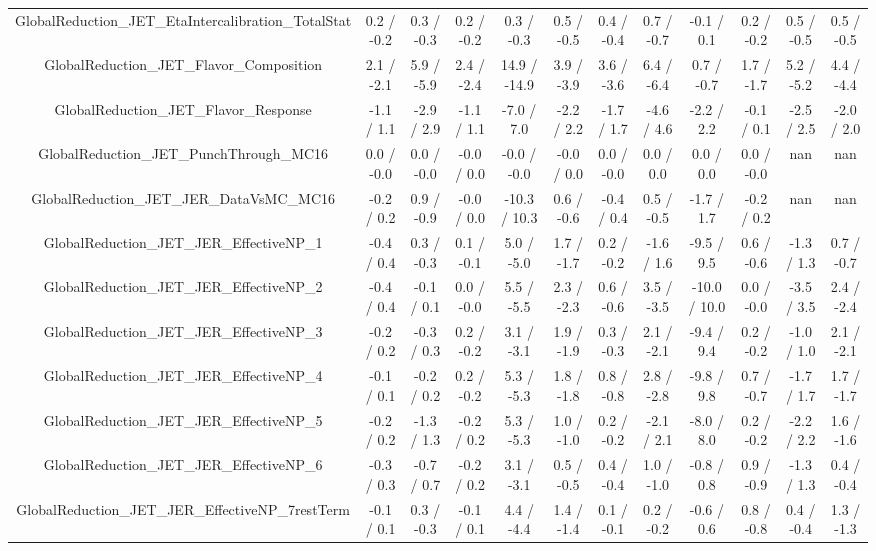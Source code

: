 \begin{table}[htbp]
\begin{center}
\begin{tabular}{|c|c|c|c|c|c|c|c|c|c|c|c|}
  GlobalReduction_JET_EtaIntercalibration_TotalStat & 0.2 / -0.2 & 0.3 / -0.3 & 0.2 / -0.2 & 0.3 / -0.3 & 0.5 / -0.5 & 0.4 / -0.4 & 0.7 / -0.7 & -0.1 / 0.1 & 0.2 / -0.2 & 0.5 / -0.5 & 0.5 / -0.5 \\ 
  GlobalReduction_JET_Flavor_Composition & 2.1 / -2.1 & 5.9 / -5.9 & 2.4 / -2.4 & 14.9 / -14.9 & 3.9 / -3.9 & 3.6 / -3.6 & 6.4 / -6.4 & 0.7 / -0.7 & 1.7 / -1.7 & 5.2 / -5.2 & 4.4 / -4.4 \\ 
  GlobalReduction_JET_Flavor_Response & -1.1 / 1.1 & -2.9 / 2.9 & -1.1 / 1.1 & -7.0 / 7.0 & -2.2 / 2.2 & -1.7 / 1.7 & -4.6 / 4.6 & -2.2 / 2.2 & -0.1 / 0.1 & -2.5 / 2.5 & -2.0 / 2.0 \\ 
  GlobalReduction_JET_PunchThrough_MC16 & 0.0 / -0.0 & 0.0 / -0.0 & -0.0 / 0.0 & -0.0 / -0.0 & -0.0 / 0.0 & 0.0 / -0.0 & 0.0 / 0.0 & 0.0 / 0.0 & 0.0 / -0.0 &    nan    &    nan    \\ 
  GlobalReduction_JET_JER_DataVsMC_MC16 & -0.2 / 0.2 & 0.9 / -0.9 & -0.0 / 0.0 & -10.3 / 10.3 & 0.6 / -0.6 & -0.4 / 0.4 & 0.5 / -0.5 & -1.7 / 1.7 & -0.2 / 0.2 &    nan    &    nan    \\ 
  GlobalReduction_JET_JER_EffectiveNP_1 & -0.4 / 0.4 & 0.3 / -0.3 & 0.1 / -0.1 & 5.0 / -5.0 & 1.7 / -1.7 & 0.2 / -0.2 & -1.6 / 1.6 & -9.5 / 9.5 & 0.6 / -0.6 & -1.3 / 1.3 & 0.7 / -0.7 \\ 
  GlobalReduction_JET_JER_EffectiveNP_2 & -0.4 / 0.4 & -0.1 / 0.1 & 0.0 / -0.0 & 5.5 / -5.5 & 2.3 / -2.3 & 0.6 / -0.6 & 3.5 / -3.5 & -10.0 / 10.0 & 0.0 / -0.0 & -3.5 / 3.5 & 2.4 / -2.4 \\ 
  GlobalReduction_JET_JER_EffectiveNP_3 & -0.2 / 0.2 & -0.3 / 0.3 & 0.2 / -0.2 & 3.1 / -3.1 & 1.9 / -1.9 & 0.3 / -0.3 & 2.1 / -2.1 & -9.4 / 9.4 & 0.2 / -0.2 & -1.0 / 1.0 & 2.1 / -2.1 \\ 
  GlobalReduction_JET_JER_EffectiveNP_4 & -0.1 / 0.1 & -0.2 / 0.2 & 0.2 / -0.2 & 5.3 / -5.3 & 1.8 / -1.8 & 0.8 / -0.8 & 2.8 / -2.8 & -9.8 / 9.8 & 0.7 / -0.7 & -1.7 / 1.7 & 1.7 / -1.7 \\ 
  GlobalReduction_JET_JER_EffectiveNP_5 & -0.2 / 0.2 & -1.3 / 1.3 & -0.2 / 0.2 & 5.3 / -5.3 & 1.0 / -1.0 & 0.2 / -0.2 & -2.1 / 2.1 & -8.0 / 8.0 & 0.2 / -0.2 & -2.2 / 2.2 & 1.6 / -1.6 \\ 
  GlobalReduction_JET_JER_EffectiveNP_6 & -0.3 / 0.3 & -0.7 / 0.7 & -0.2 / 0.2 & 3.1 / -3.1 & 0.5 / -0.5 & 0.4 / -0.4 & 1.0 / -1.0 & -0.8 / 0.8 & 0.9 / -0.9 & -1.3 / 1.3 & 0.4 / -0.4 \\ 
  GlobalReduction_JET_JER_EffectiveNP_7restTerm & -0.1 / 0.1 & 0.3 / -0.3 & -0.1 / 0.1 & 4.4 / -4.4 & 1.4 / -1.4 & 0.1 / -0.1 & 0.2 / -0.2 & -0.6 / 0.6 & 0.8 / -0.8 & 0.4 / -0.4 & 1.3 / -1.3 \\ 

\end{tabular}
\end{center}
\end{table}

